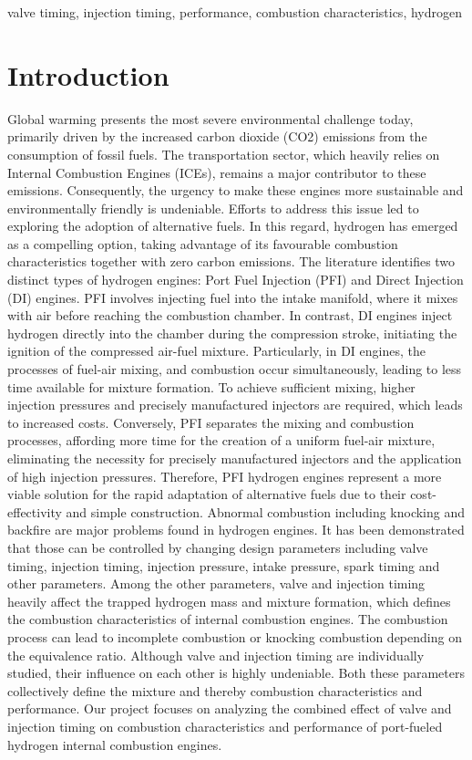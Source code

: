 \documentclass[conference]{IEEEtran}
\begin{document}
\begin{IEEEkeywords}
valve timing, injection timing, performance, combustion characteristics, hydrogen
\end{IEEEkeywords}

\section{Introduction}
Global warming presents the most severe environmental challenge today, primarily driven by the increased carbon dioxide (CO2) emissions from the consumption of fossil fuels. The transportation sector, which heavily relies on Internal Combustion Engines (ICEs), remains a major contributor to these emissions. Consequently, the urgency to make these engines more sustainable and environmentally friendly is undeniable. Efforts to address this issue led to exploring the adoption of alternative fuels. In this regard, hydrogen has emerged as a compelling option, taking advantage of its favourable combustion characteristics together with zero carbon emissions. 
The literature identifies two distinct types of hydrogen engines: Port Fuel Injection (PFI) and Direct Injection (DI) engines. PFI involves injecting fuel into the intake manifold, where it mixes with air before reaching the combustion chamber. In contrast, DI engines inject hydrogen directly into the chamber during the compression stroke, initiating the ignition of the compressed air-fuel mixture. Particularly, in DI engines, the processes of fuel-air mixing, and combustion occur simultaneously, leading to less time available for mixture formation. To achieve sufficient mixing, higher injection pressures and precisely manufactured injectors are required, which leads to increased costs. Conversely, PFI separates the mixing and combustion processes, affording more time for the creation of a uniform fuel-air mixture, eliminating the necessity for precisely manufactured injectors and the application of high injection pressures. Therefore, PFI hydrogen engines represent a more viable solution for the rapid adaptation of alternative fuels due to their cost-effectivity and simple construction.
Abnormal combustion including knocking and backfire are major problems found in hydrogen engines. It has been demonstrated that those can be controlled by changing design parameters including valve timing, injection timing, injection pressure, intake pressure, spark timing and other parameters. Among the other parameters, valve and injection timing heavily affect the trapped hydrogen mass and mixture formation, which defines the combustion characteristics of internal combustion engines. The combustion process can lead to incomplete combustion or knocking combustion depending on the equivalence ratio.
Although valve and injection timing are individually studied, their influence on each other is highly undeniable. Both these parameters collectively define the mixture and thereby combustion characteristics and performance. Our project focuses on analyzing the combined effect of valve and injection timing on combustion characteristics and performance of port-fueled hydrogen internal combustion engines.
\end{document}
